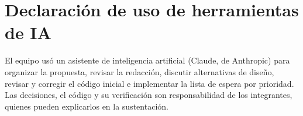 \documentclass[conference]{IEEEtran}
\begin{document}

\section*{Declaración de uso de herramientas de IA}
El equipo usó un asistente de inteligencia artificial (Claude, de Anthropic) para organizar la propuesta, revisar la redacción, discutir alternativas de diseño, revisar y corregir el código inicial e implementar la lista de espera por prioridad. Las decisiones, el código y su verificación son responsabilidad de los integrantes, quienes pueden explicarlos en la sustentación.

\end{document}
